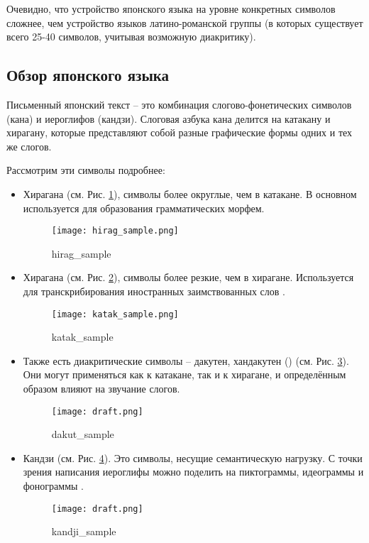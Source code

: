 Очевидно, что устройство японского языка на уровне конкретных символов сложнее, чем устройство языков латино-романской группы (в которых существует всего 25-40 символов, учитывая возможную диакритику).

\subsection{ Обзор японского языка }

Письменный японский текст -- это комбинация слогово-фонетических символов (кана) и иероглифов (кандзи).
Слоговая азбука кана делится на катакану и хирагану, которые представляют собой разные графические формы одних и тех же слогов. 

Рассмотрим эти символы подробнее:

\begin{itemize}
	\item Хирагана (см. Рис. \ref{fig:hirag_sample}), символы более округлые, чем в катакане. В основном используется для образования грамматических морфем.
	\begin{figure}[H]
		\centering
		\texttt{[image: hirag\_sample.png]}
		\caption{hirag\_sample}
		\label{fig:hirag_sample}
	\end{figure}
	
	\item Хирагана (см. Рис. \ref{fig:katak_sample}), символы более резкие, чем в хирагане. Используется для транскрибирования иностранных заимствованных слов .
	\begin{figure}[H]
		\centering
		\texttt{[image: katak\_sample.png]}
		\caption{katak\_sample}
		\label{fig:katak_sample}
	\end{figure}

	\item Также есть диакритические символы -- дакутен, хандакутен () (см. Рис. \ref{fig:dakut_sample}). Они могут применяться как к катакане, так и к хирагане, и определённым образом влияют на звучание слогов.
	\begin{figure}[H]
		\centering
		\texttt{[image: draft.png]}
		\caption{dakut\_sample}
		\label{fig:dakut_sample}
	\end{figure}

	\item Кандзи (см. Рис. \ref{fig:kandji_sample}). Это символы, несущие семантическую нагрузку. С точки зрения написания иероглифы можно поделить на пиктограммы, идеограммы и фонограммы . 
	\begin{figure}[H]
		\centering
		\texttt{[image: draft.png]}
		\caption{kandji\_sample}
		\label{fig:kandji_sample}
	\end{figure}
\end{itemize}

